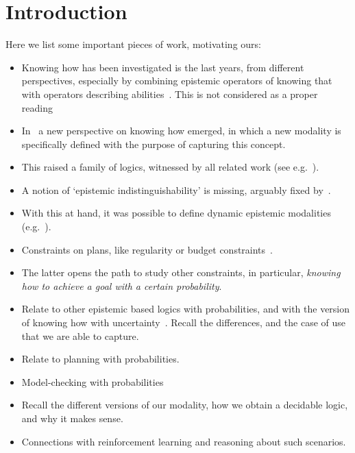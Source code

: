 \section{Introduction}
\label{sec:intro}

Here we list some important pieces of work, motivating ours:

\begin{itemize}
    \item Knowing how has been investigated is the last years, from different perspectives, especially by combining epistemic operators of knowing that with operators describing abilities~\cite{Mccarthy69,Moore85,Les00,Hoek00,HerzigT06}. This is not considered as a proper reading~\cite{JamrogaA07,Herzig15}
    \item In~\cite{Wang15lori,Wang16,Wang2016} a new perspective on knowing how emerged, in which a new modality is specifically defined with the purpose of capturing this concept.
    \item This raised a family of logics, witnessed by all related work (see e.g.~\cite{LiWang17,Li17,Li17bis,FervariHLW17,LiW21,NaumovT17,NaumovT18,NaumovT19,Naumov2018a}).
    \item A notion of `epistemic indistinguishability' is missing, arguably fixed by~\cite{AFSVQ21,AFSVQ23}.
    \item With this at hand, it was possible to define dynamic epistemic modalities (e.g.~\cite{AFSV22}).
    \item Constraints on plans, like regularity or budget constraints~\cite{DemriF23}.
    \item The latter opens the path to study other constraints, in particular, \emph{knowing how to achieve a goal with a certain probability}.
    \item Relate to other epistemic based logics with probabilities, and with the version of knowing how with uncertainty~\cite{NaumovT19}. Recall the differences, and the case of use that we are able to capture.
    \item Relate to planning with probabilities.
    \item Model-checking with probabilities \cite{BA95,TJ07,BaierAFK18}
    \item Recall the different versions of our modality, how we obtain a decidable logic, and why it makes sense.
    \item Connections with reinforcement learning and reasoning about such scenarios.
\end{itemize}